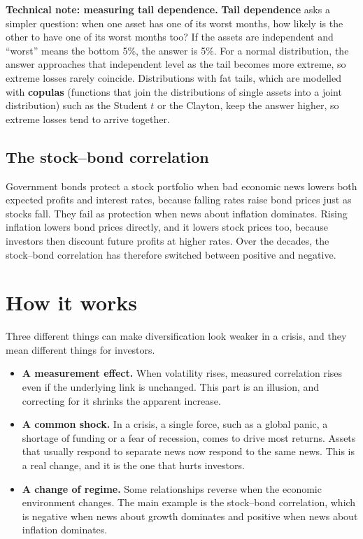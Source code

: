 \begin{technote}
\textbf{Technical note: measuring tail dependence.} \textbf{Tail dependence} asks a simpler question: when one asset has one of its worst months, how likely is the other to have one of its worst months too? If the assets are independent and ``worst'' means the bottom 5\%, the answer is 5\%. For a normal distribution, the answer approaches that independent level as the tail becomes more extreme, so extreme losses rarely coincide. Distributions with fat tails, which are modelled with \textbf{copulas} (functions that join the distributions of single assets into a joint distribution) such as the Student $t$ or the Clayton, keep the answer higher, so extreme losses tend to arrive together.
\end{technote}

\subsection{The stock--bond correlation}

Government bonds protect a stock portfolio when bad economic news lowers both expected profits and interest rates, because falling rates raise bond prices just as stocks fall. They fail as protection when news about inflation dominates. Rising inflation lowers bond prices directly, and it lowers stock prices too, because investors then discount future profits at higher rates. Over the decades, the stock--bond correlation has therefore switched between positive and negative.


\section{How it works}
\label{sec:13-how}

Three different things can make diversification look weaker in a crisis, and they mean different things for investors.

\begin{itemize}
  \item \textbf{A measurement effect.} When volatility rises, measured correlation rises even if the underlying link is unchanged. This part is an illusion, and correcting for it shrinks the apparent increase.
  \item \textbf{A common shock.} In a crisis, a single force, such as a global panic, a shortage of funding or a fear of recession, comes to drive most returns. Assets that usually respond to separate news now respond to the same news. This is a real change, and it is the one that hurts investors.
  \item \textbf{A change of regime.} Some relationships reverse when the economic environment changes. The main example is the stock--bond correlation, which is negative when news about growth dominates and positive when news about inflation dominates.
\end{itemize}

